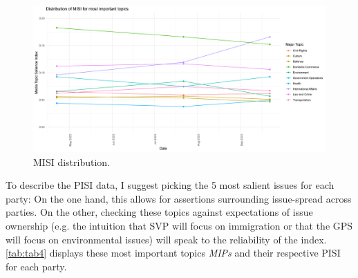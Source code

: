 \documentclass[11pt,a4paper]{article}
\begin{document}
\begin{figure}
    \centering
    \includegraphics[width=1\linewidth]{output/plots/plot_figure_5.png}
    \caption{MISI distribution.}
    \label{fig:fig5}
\end{figure}

To describe the PISI data, I suggest picking the 5 most salient issues for each party: On the one hand, this allows for assertions surrounding issue-spread across parties. On the other, checking these topics against expectations of issue ownership (e.g. the intuition that SVP will focus on immigration or that the GPS will focus on environmental issues) will speak to the reliability of the index. \autoref{tab:tab4} displays these most important topics \textit{MIPs} and their respective PISI for each party.
\end{document}
